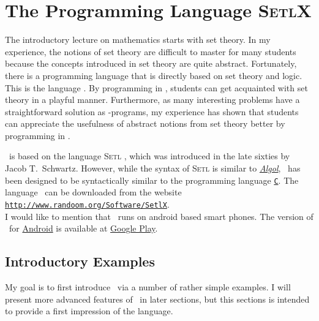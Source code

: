 \chapter{The Programming Language \textsc{SetlX}}
The introductory lecture on mathematics starts with set theory.  In my experience, the notions of
set theory are difficult to master for many students because the concepts introduced in set theory
are quite abstract.  Fortunately, there is a programming language that is directly based on set
theory and logic.  This is the language \href{http://www.randoom.org/Software/SetlX}{\setl}.
By programming in \setl, students can get acquainted with set theory in a playful manner.
Furthermore, as many interesting problems have a straightforward solution as \setl-programs,
my experience has shown that students can appreciate the usefulness of abstract notions from set
theory better by programming in \setl.

\setl\ is based on the language \textsc{Setl} \cite{setl86}, which was introduced in the late
sixties by Jacob T.~Schwartz.  However, while the syntax of \textsc{Setl} is similar to
\href{https://en.wikipedia.org/wiki/ALGOL}{\textsl{Algol}}, \setl\ has been designed to be
syntactically similar to the programming language
\href{https://en.wikipedia.org/wiki/C_(programming_language)}{\texttt{C}}. 
The language \setl\ can be downloaded from the website
\\[0.2cm]
\hspace*{1.3cm}
\href{http://www.randoom.org/Software/SetlX}{\texttt{http://www.randoom.org/Software/SetlX}}.
\\[0.2cm]
I would like to mention that \setl\ runs on android based smart phones.  The version of \setl\ for
\href{https://en.wikipedia.org/wiki/Android_(operating_system)}{Android} is available at
\href{https://play.google.com/store/apps/details?id=org.randoom.setlxUI.android&hl=en}{Google Play}.

\section{Introductory Examples}
My goal is to first introduce \setl\ via a number of rather simple examples.  I will present more
advanced features of \setl\ in later sections, but this sections  is intended to provide a first
impression of the language.


